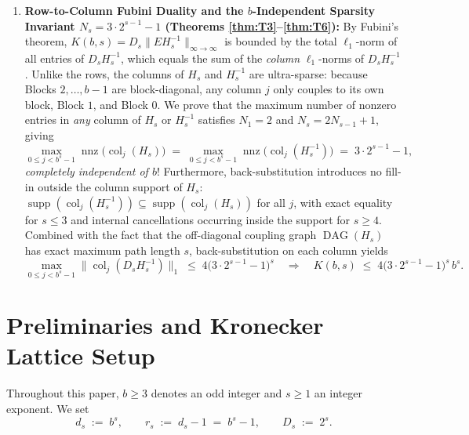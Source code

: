 \documentclass[11pt,a4paper]{article}
\theoremstyle{plain}
\theoremstyle{definition}
\newcommand{\supp}{\operatorname{supp}}
\newcommand{\nnz}{\operatorname{nnz}}
\newcommand{\DAG}{\operatorname{DAG}}
\newcommand{\col}{\operatorname{col}}
\begin{document}
\begin{enumerate}[label=\textbf{(\arabic*)},leftmargin=2.2em]
\item \textbf{Row-to-Column Fubini Duality and the $b$-Independent Sparsity Invariant $N_s = 3 \cdot 2^{s-1} - 1$ (Theorems \ref{thm:T3}--\ref{thm:T6}):}
By Fubini's theorem, $K(b,s) = D_s \|E H_s^{-1}\|_{\infty \to \infty}$ is bounded by the total $\ell_1$-norm of all entries of $D_s H_s^{-1}$, which equals the sum of the \emph{column} $\ell_1$-norms of $D_s H_s^{-1}$. Unlike the rows, the columns of $H_s$ and $H_s^{-1}$ are ultra-sparse: because Blocks $2,\dots,b-1$ are block-diagonal, any column $j$ only couples to its own block, Block $1$, and Block $0$. We prove that the maximum number of nonzero entries in \emph{any} column of $H_s$ or $H_s^{-1}$ satisfies $N_1 = 2$ and $N_s = 2 N_{s-1} + 1$, giving
\[
\max_{0 \le j < b^s - 1} \nnz\big(\col_j(H_s)\big) \;=\; \max_{0 \le j < b^s - 1} \nnz\big(\col_j(H_s^{-1})\big) \;=\; 3 \cdot 2^{s-1} - 1,
\]
\emph{completely independent of $b$}! Furthermore, back-substitution introduces no fill-in outside the column support of $H_s$: $\supp(\col_j(H_s^{-1})) \subseteq \supp(\col_j(H_s))$ for all $j$, with exact equality for $s \le 3$ and internal cancellations occurring inside the support for $s \ge 4$. Combined with the fact that the off-diagonal coupling graph $\DAG(H_s)$ has exact maximum path length $s$, back-substitution on each column yields
\[
\max_{0 \le j < b^s - 1} \|\col_j(D_s H_s^{-1})\|_1 \;\le\; 4\big(3 \cdot 2^{s-1} - 1\big)^s
\quad\Longrightarrow\quad
K(b,s) \;\le\; 4\big(3 \cdot 2^{s-1} - 1\big)^s \, b^s.
\]
\end{enumerate}

\section{Preliminaries and Kronecker Lattice Setup}

Throughout this paper, $b \ge 3$ denotes an odd integer and $s \ge 1$ an integer exponent. We set
\[
d_s \;:=\; b^s, \qquad r_s \;:=\; d_s - 1 \;=\; b^s - 1, \qquad D_s \;:=\; 2^s.
\]
\end{document}
